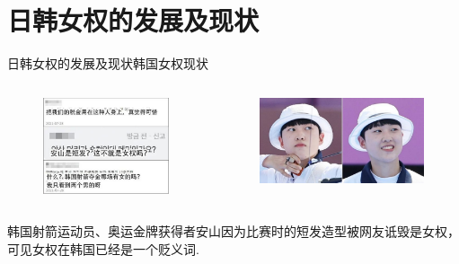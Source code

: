 \documentclass{beamer}
\begin{document}
	\section{日韩女权的发展及现状}
	\begin{frame}{日韩女权的发展及现状}{韩国女权现状}
		\begin{columns}
			\begin{figure}
				\centering
				\includegraphics[width=\textwidth]{img/图片14.png}
			\end{figure}

			\begin{figure}
				\centering
				\includegraphics[width=\textwidth]{img/图片15.png}
			\end{figure}
		\end{columns}
		韩国射箭运动员、奥运金牌获得者安山因为比赛时的短发造型被网友诋毁是女权，可见女权在韩国已经是一个贬义词.
	\end{frame}
\end{document}
